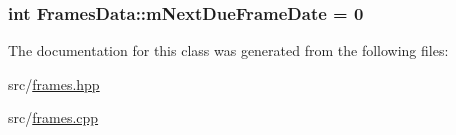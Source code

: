 \subsubsection[{\texorpdfstring{m\+Next\+Due\+Frame\+Date}{mNextDueFrameDate}}]{\setlength{\rightskip}{0pt plus 5cm}int Frames\+Data\+::m\+Next\+Due\+Frame\+Date = 0\hspace{0.3cm}{\ttfamily [static]}}\hypertarget{class_frames_data_ac0c60108ce1672499d5d69d9c8ea9111}{}\label{class_frames_data_ac0c60108ce1672499d5d69d9c8ea9111}


The documentation for this class was generated from the following files\+:\begin{DoxyCompactItemize}
\item 
src/\hyperlink{frames_8hpp}{frames.\+hpp}\item 
src/\hyperlink{frames_8cpp}{frames.\+cpp}\end{DoxyCompactItemize}

